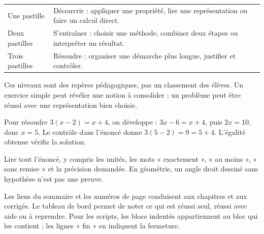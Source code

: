 \clearpage\thispagestyle{otFront}\label{mode-emploi}\fontsize{11}{15}\selectfont

\begin{tabularx}{\linewidth}{@{}lY@{}}\toprule
Une pastille & Découvrir : appliquer une propriété, lire une représentation ou faire un calcul direct.\\[3mm]
Deux pastilles & S’entraîner : choisir une méthode, combiner deux étapes ou interpréter un résultat.\\[3mm]
Trois pastilles & Résoudre : organiser une démarche plus longue, justifier et contrôler.\\\bottomrule
\end{tabularx}\par\medskip
Ces niveaux sont des repères pédagogiques, pas un classement des élèves.
Un exercice simple peut révéler une notion à consolider ; un problème peut
être réussi avec une représentation bien choisie.\par\medskip
\begin{exemple}Pour résoudre $3(x-2)=x+4$, on développe : $3x-6=x+4$, puis $2x=10$, donc $x=5$. Le contrôle dans l’énoncé donne $3(5-2)=9=5+4$. L’égalité obtenue vérifie la solution.\end{exemple}
\begin{attention}Lire tout l’énoncé, y compris les unités, les mots « exactement », « au moins », « sans remise » et la précision demandée. En géométrie, un angle droit dessiné sans hypothèse n’est pas une preuve.\end{attention}
Les liens du sommaire et les numéros de page conduisent aux chapitres et
aux corrigés. Le tableau de bord permet de noter ce qui est réussi seul,
réussi avec aide ou à reprendre. Pour les scripts, les blocs indentés
appartiennent au bloc qui les contient ; les lignes « fin » en indiquent la fermeture.

\clearpage
